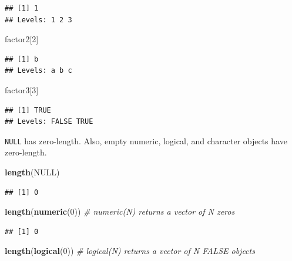 \documentclass[]{book}
\newenvironment{Shaded}{\begin{snugshade}}{\end{snugshade}}
\newcommand{\KeywordTok}[1]{\textcolor[rgb]{0.13,0.29,0.53}{\textbf{{#1}}}}
\newcommand{\DecValTok}[1]{\textcolor[rgb]{0.00,0.00,0.81}{{#1}}}
\newcommand{\CommentTok}[1]{\textcolor[rgb]{0.56,0.35,0.01}{\textit{{#1}}}}
\newcommand{\OtherTok}[1]{\textcolor[rgb]{0.56,0.35,0.01}{{#1}}}
\newcommand{\NormalTok}[1]{{#1}}
\theoremstyle{definition}
\theoremstyle{definition}
\theoremstyle{remark}
\begin{document}
\begin{verbatim}
## [1] 1
## Levels: 1 2 3
\end{verbatim}

\begin{Shaded}
\begin{Highlighting}[]
\NormalTok{factor2[}\DecValTok{2}\NormalTok{]}
\end{Highlighting}
\end{Shaded}

\begin{verbatim}
## [1] b
## Levels: a b c
\end{verbatim}

\begin{Shaded}
\begin{Highlighting}[]
\NormalTok{factor3[}\DecValTok{3}\NormalTok{]}
\end{Highlighting}
\end{Shaded}

\begin{verbatim}
## [1] TRUE
## Levels: FALSE TRUE
\end{verbatim}

\texttt{NULL} has zero-length. Also, empty numeric, logical, and
character objects have zero-length.

\begin{Shaded}
\begin{Highlighting}[]
\KeywordTok{length}\NormalTok{(}\OtherTok{NULL}\NormalTok{) }
\end{Highlighting}
\end{Shaded}

\begin{verbatim}
## [1] 0
\end{verbatim}

\begin{Shaded}
\begin{Highlighting}[]
\KeywordTok{length}\NormalTok{(}\KeywordTok{numeric}\NormalTok{(}\DecValTok{0}\NormalTok{))  }\CommentTok{# numeric(N) returns a vector of N zeros }
\end{Highlighting}
\end{Shaded}

\begin{verbatim}
## [1] 0
\end{verbatim}

\begin{Shaded}
\begin{Highlighting}[]
\KeywordTok{length}\NormalTok{(}\KeywordTok{logical}\NormalTok{(}\DecValTok{0}\NormalTok{))  }\CommentTok{# logical(N) returns a vector of N FALSE objects}
\end{Highlighting}
\end{Shaded}
\end{document}

